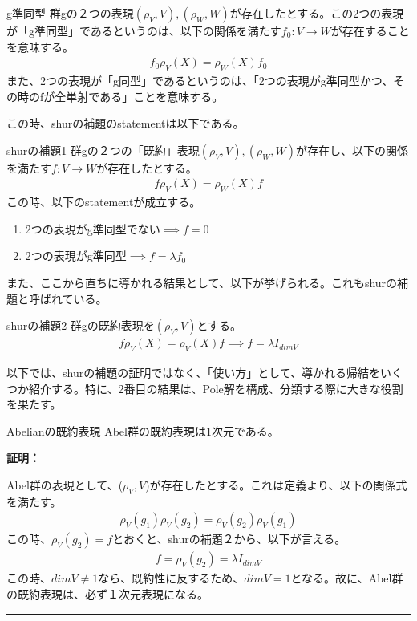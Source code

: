 \documentclass[dvipdfmx,a4paper,10.5pt]{article}
\numberwithin{equation}{section}
\newenvironment{proofbox}
{\begin{prooflabel}\textbf{証明：}\end{prooflabel}\vspace{0.8em}}
{\par\vspace{1em}\hrule\vspace{1em}}
\begin{document}
\begin{defbox}{g準同型}
群gの２つの表現$(\rho_{V},V),(\rho_{W},W)$が存在したとする。この2つの表現が「g準同型」であるというのは、以下の関係を満たす$f_{0}:V\to W$が存在することを意味する。
\begin{align*}
    f_{0}\rho_{V}(X)=\rho_{W}(X)f_{0}
\end{align*}
また、2つの表現が「g同型」であるというのは、「2つの表現がg準同型かつ、その時のfが全単射である」ことを意味する。
\end{defbox}
この時、shurの補題のstatementは以下である。
\begin{theorembox}{shurの補題1}
群gの２つの「既約」表現$(\rho_{V},V),(\rho_{W},W)$が存在し、以下の関係を満たす$f:V\to W$が存在したとする。
\begin{align*}
    f\rho_{V}(X)=\rho_{W}(X)f
\end{align*}
この時、以下のstatementが成立する。
\begin{enumerate}
    \item 2つの表現がg準同型でない$\implies f=0$ 
    \item 2つの表現がg準同型$\implies f=\lambda f_{0}$ 
\end{enumerate}
\end{theorembox}
また、ここから直ちに導かれる結果として、以下が挙げられる。これもshurの補題と呼ばれている。
\begin{theorembox}{shurの補題2}
群gの既約表現を$(\rho_{V},V)$とする。
\begin{align*}
    f\rho_{V}(X)=\rho_{V}(X)f \implies f=\lambda I_{dimV}
\end{align*}
\end{theorembox}
以下では、shurの補題の証明ではなく、「使い方」として、導かれる帰結をいくつか紹介する。特に、2番目の結果は、Pole解を構成、分類する際に大きな役割を果たす。
\begin{resultbox}{Abelianの既約表現}
    Abel群の既約表現は1次元である。
\end{resultbox}
\begin{proofbox}
    Abel群の表現として、($\rho_{V},V$)が存在したとする。これは定義より、以下の関係式を満たす。
    \begin{align*}
        \rho_{V}(g_{1})\rho_{V}(g_{2})=\rho_{V}(g_{2})\rho_{V}(g_{1})
    \end{align*}
    この時、$\rho_{V}(g_{2})=f$とおくと、shurの補題２から、以下が言える。
    \begin{align*}
        f=\rho_{V}(g_{2})=\lambda I_{dimV}
    \end{align*}
    この時、$dimV\neq 1$なら、既約性に反するため、$dimV=1$となる。故に、Abel群の既約表現は、必ず１次元表現になる。
\end{proofbox}
\end{document}
